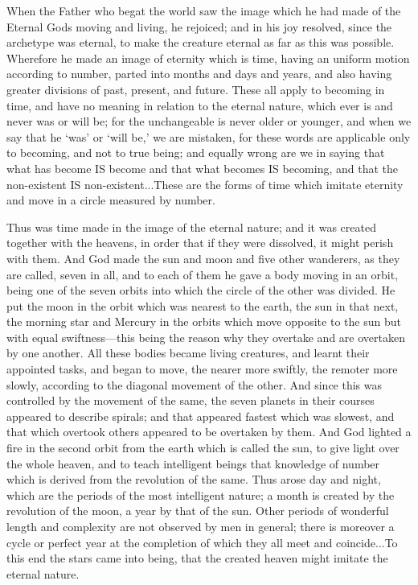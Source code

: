 \documentclass[11pt,letter]{article}
\begin{document}
\par  When the Father who begat the world saw the image which he had made of the Eternal Gods moving and living, he rejoiced; and in his joy resolved, since the archetype was eternal, to make the creature eternal as far as this was possible. Wherefore he made an image of eternity which is time, having an uniform motion according to number, parted into months and days and years, and also having greater divisions of past, present, and future. These all apply to becoming in time, and have no meaning in relation to the eternal nature, which ever is and never was or will be; for the unchangeable is never older or younger, and when we say that he ‘was’ or ‘will be,’ we are mistaken, for these words are applicable only to becoming, and not to true being; and equally wrong are we in saying that what has become IS become and that what becomes IS becoming, and that the non-existent IS non-existent...These are the forms of time which imitate eternity and move in a circle measured by number.

\par  Thus was time made in the image of the eternal nature; and it was created together with the heavens, in order that if they were dissolved, it might perish with them. And God made the sun and moon and five other wanderers, as they are called, seven in all, and to each of them he gave a body moving in an orbit, being one of the seven orbits into which the circle of the other was divided. He put the moon in the orbit which was nearest to the earth, the sun in that next, the morning star and Mercury in the orbits which move opposite to the sun but with equal swiftness—this being the reason why they overtake and are overtaken by one another. All these bodies became living creatures, and learnt their appointed tasks, and began to move, the nearer more swiftly, the remoter more slowly, according to the diagonal movement of the other. And since this was controlled by the movement of the same, the seven planets in their courses appeared to describe spirals; and that appeared fastest which was slowest, and that which overtook others appeared to be overtaken by them. And God lighted a fire in the second orbit from the earth which is called the sun, to give light over the whole heaven, and to teach intelligent beings that knowledge of number which is derived from the revolution of the same. Thus arose day and night, which are the periods of the most intelligent nature; a month is created by the revolution of the moon, a year by that of the sun. Other periods of wonderful length and complexity are not observed by men in general; there is moreover a cycle or perfect year at the completion of which they all meet and coincide...To this end the stars came into being, that the created heaven might imitate the eternal nature.
\end{document}
